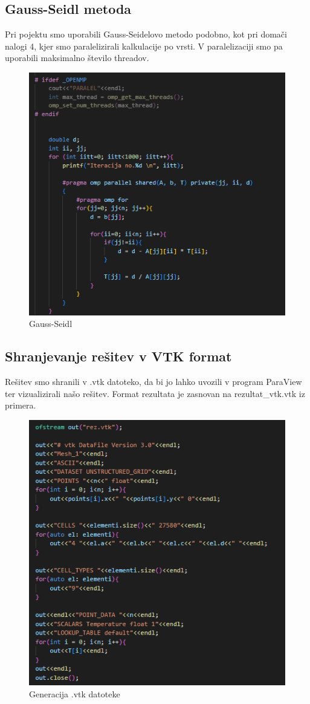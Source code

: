 \documentclass[12pt]{article}
\begin{document}
\subsection{Gauss-Seidl metoda}
    Pri pojektu smo uporabili Gauss-Seidelovo metodo podobno, kot pri domači nalogi 4, kjer smo paralelizirali kalkulacije po vrsti. V paralelizaciji smo pa uporabili maksimalno število threadov.
            \begin{figure}[ht]
                \centering
                \includegraphics[width=0.5\linewidth]{gauss_paralelizacija.png}
                \renewcommand*\figurename{Slika}
                \caption{Gauss-Seidl}
                \label{Slika:11}
            \end{figure}
\FloatBarrier
\subsection{Shranjevanje rešitev v VTK format}
    Rešitev smo shranili v .vtk datoteko, da bi jo lahko uvozili v program ParaView ter vizualizirali našo rešitev. Format rezultata je zasnovan na rezultat\_vtk.vtk iz primera.
        \begin{figure}[ht]
            \centering
            \includegraphics[width=0.5\linewidth]{generateVtk.png}
            \renewcommand*\figurename{Slika}
            \caption{Generacija .vtk datoteke}
            \label{Slika:12}
        \end{figure}
\FloatBarrier
\end{document}
